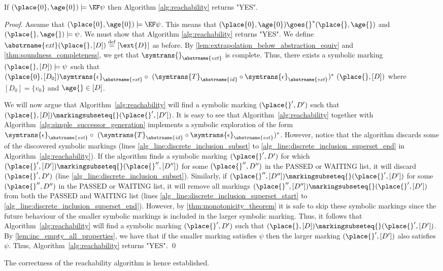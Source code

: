 \begin{lemma}\label{lem:init_marking_satisfies_property_implies_algorithm_yes}
If $(\place{0},\age{0}) \models \EF \psi$ then 
Algorithm \ref{alg:reachability} returns "YES".
\end{lemma}

\begin{proof}
Assume that $(\place{0},\age{0}) \models \EF \psi$. This means that 
$(\place{0},\age{0}) \goes{}^* (\place{},\age{})$ and $(\place{}, \age{}) \models \psi$. We must show that Algorithm \ref{alg:reachability} 
returns "YES".
We define $\abstrname{\mathit{ext}}(\place{}, [D]) \stackrel{\text{def}}{=} [\ext{D}]$ as before.
By \cref{lem:extrapolation_below_abstraction_equiv} and \cref{thm:soundness_completeness}, we get that $\symtrans{}_{\abstrname{\mathit{ext}}}$ is complete. Thus, there exists a symbolic marking $(\place{},[D]) \models \psi$ such that $(\place{0}, [D_0]) \symtrans{\epsilon}_{\abstrname{\mathit{ext}}} \circ \, \, (\symtrans{T}_{\abstrname{\mathit{id}}} \circ \symtrans{\epsilon}_{\abstrname{\mathit{ext}}})^* \,\, (\place{}, [D])$ where $[D_0] = \{ v_0 \}$ and $\age{} \in [D]$.

We will now argue that Algorithm~\ref{alg:reachability} will find a symbolic marking  $(\place{}', D')$ such that $(\place{},[D]) \markingsubseteq{} (\place{}', [D'])$. It is easy to see that Algorithm~\ref{alg:reachability} together with Algorithm~\ref{alg:simple_successor_generation} implements a symbolic exploration of the form $\symtrans{\epsilon}_{\abstrname{\mathit{ext}}} \circ \, \, (\symtrans{T}_{\abstrname{\mathit{id}}} \circ \symtrans{\epsilon}_{\abstrname{\mathit{ext}}})^*$. 
However, notice that the algorithm discards some of the discovered symbolic markings (lines \ref{alg_line:discrete_inclusion_subset} to \ref{alg_line:discrete_inclusion_superset_end} in Algorithm~\ref{alg:reachability}). If the algorithm finds a symbolic marking $(\place{}',D')$ for which $(\place{}',[D']) \markingsubseteq{} (\place{}'',[D''])$ for some $(\place{}'',D'')$ in the PASSED or WAITING list, it will discard $(\place{}',D')$ (line \ref{alg_line:discrete_inclusion_subset}). Similarly, if $(\place{}'',[D'']) \markingsubseteq{} (\place{}',[D'])$ for some $(\place{}'',D'')$ in the PASSED or WAITING list, it will remove all markings $(\place{}'',[D'']) \markingsubseteq{} (\place{}',[D'])$ from both the PASSED and WAITING list (lines \ref{alg_line:discrete_inclusion_superset_start} to \ref{alg_line:discrete_inclusion_superset_end}). However, by \cref{thm:monotonicity_theorem} it is safe to skip these symbolic markings since the future behaviour of the smaller symbolic markings is included in the larger symbolic marking. 
Thus, it follows that Algorithm~\ref{alg:reachability} will find a symbolic marking $(\place{}',D')$ such that $(\place{},[D]) \markingsubseteq{} (\place{}', [D'])$. 
By \cref{lem:inc_empty_all_properties}, we have that if the smaller marking satisfies $\psi$ then the larger marking $(\place{}',[D'])$ also satisfies $\psi$.  
Thus, Algorithm~\ref{alg:reachability} returns "YES".
\qed
\end{proof}










The correctness of the reachability algorithm is hence established.
